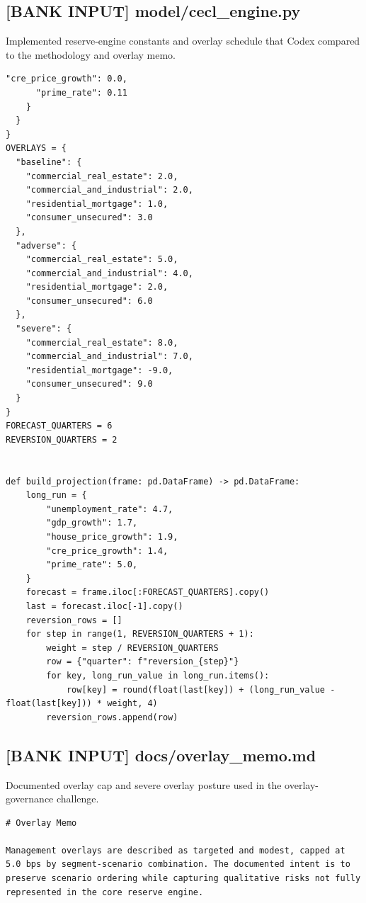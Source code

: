 \documentclass[11pt]{article}
\begin{document}
\subsection*{[BANK INPUT] model/cecl\_engine.py}
Implemented reserve-engine constants and overlay schedule that Codex compared to the methodology and overlay memo.
\begin{Verbatim}[fontsize=\small]
"cre_price_growth": 0.0,
      "prime_rate": 0.11
    }
  }
}
OVERLAYS = {
  "baseline": {
    "commercial_real_estate": 2.0,
    "commercial_and_industrial": 2.0,
    "residential_mortgage": 1.0,
    "consumer_unsecured": 3.0
  },
  "adverse": {
    "commercial_real_estate": 5.0,
    "commercial_and_industrial": 4.0,
    "residential_mortgage": 2.0,
    "consumer_unsecured": 6.0
  },
  "severe": {
    "commercial_real_estate": 8.0,
    "commercial_and_industrial": 7.0,
    "residential_mortgage": -9.0,
    "consumer_unsecured": 9.0
  }
}
FORECAST_QUARTERS = 6
REVERSION_QUARTERS = 2


def build_projection(frame: pd.DataFrame) -> pd.DataFrame:
    long_run = {
        "unemployment_rate": 4.7,
        "gdp_growth": 1.7,
        "house_price_growth": 1.9,
        "cre_price_growth": 1.4,
        "prime_rate": 5.0,
    }
    forecast = frame.iloc[:FORECAST_QUARTERS].copy()
    last = forecast.iloc[-1].copy()
    reversion_rows = []
    for step in range(1, REVERSION_QUARTERS + 1):
        weight = step / REVERSION_QUARTERS
        row = {"quarter": f"reversion_{step}"}
        for key, long_run_value in long_run.items():
            row[key] = round(float(last[key]) + (long_run_value - float(last[key])) * weight, 4)
        reversion_rows.append(row)
\end{Verbatim}
\subsection*{[BANK INPUT] docs/overlay\_memo.md}
Documented overlay cap and severe overlay posture used in the overlay-governance challenge.
\begin{Verbatim}[fontsize=\small]
# Overlay Memo

Management overlays are described as targeted and modest, capped at 5.0 bps by segment-scenario combination. The documented intent is to preserve scenario ordering while capturing qualitative risks not fully represented in the core reserve engine.
\end{Verbatim}
\end{document}
